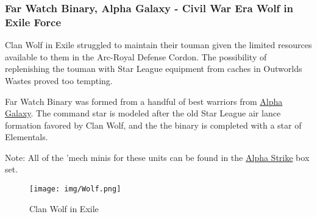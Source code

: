 \subsubsection{Far Watch Binary, Alpha Galaxy - Civil War Era Wolf in Exile Force}

Clan Wolf in Exile struggled to maintain their touman given the limited resources available to them in the Arc-Royal Defense Cordon.
The possibility of replenishing the touman with Star League equipment from caches in Outworlds Wastes proved too tempting.

Far Watch Binary was formed from a handful of best warriors from \href{https://www.sarna.net/wiki/Alpha_Galaxy_(Clan_Wolf-in-Exile)}{Alpha Galaxy}.
The command star is modeled after the old Star League air lance formation favored by Clan Wolf, and the the binary is completed with a star of Elementals.
          	
Note: All of the 'mech minis for these units can be found in the \href{https://www.sarna.net/wiki/Alpha_Strike_Boxed_Set}{Alpha Strike} box set. 

\begin{figure}[!h]
  \centering
  \texttt{[image: img/Wolf.png]}
  \caption*{Clan Wolf in Exile}
\end{figure}

